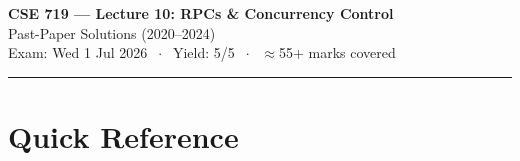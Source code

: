 \documentclass[11pt,a4paper]{article}
\begin{document}
\begin{center}
{\LARGE\bfseries CSE 719 — Lecture 10: RPCs \& Concurrency Control}\\[4pt]
{\large Past-Paper Solutions (2020--2024)}\\[2pt]
{\normalsize Exam: Wed 1 Jul 2026 $\;\cdot\;$ Yield: 5/5 $\;\cdot\;$ $\approx$55+ marks covered}
\end{center}
\vspace{-4pt}\hrule\vspace{8pt}

\section{Quick Reference}
\end{document}
